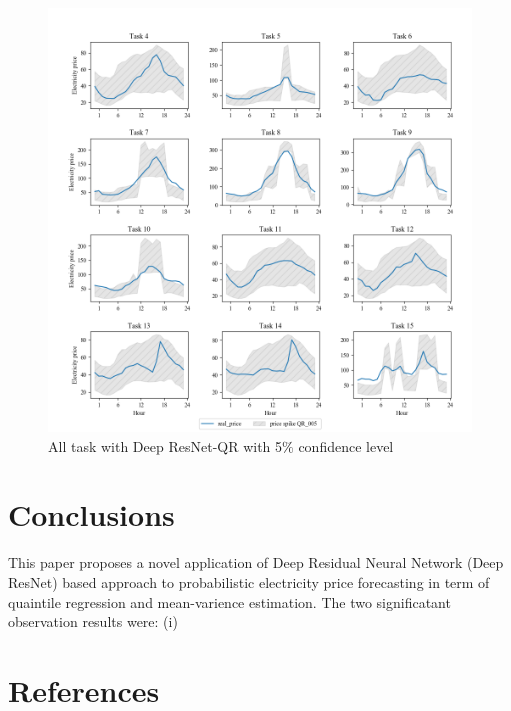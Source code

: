 \documentclass[review]{elsarticle}
\begin{document}
    \begin{figure}[H]
      \includegraphics[width=15cm]{All_task_with_spike_price_QR_005}
      \caption{All task with Deep ResNet-QR with 5$\%$ confidence level}
      \label{Fig:all_task_QR_005}
      \centering
    \end{figure}
  \section{Conclusions}
    This paper proposes a novel application of Deep Residual Neural Network (Deep ResNet) based approach to probabilistic electricity price forecasting in term of quaintile regression and mean-varience estimation. The two significatant observation results were: (i)
  \section*{References}
  
\end{document}

